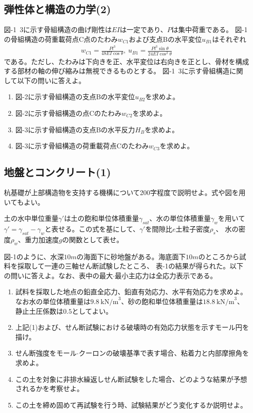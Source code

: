 \subsection{弾性体と構造の力学(2)}
図-1~3に示す骨組構造の曲げ剛性は$EI$は一定であり、$P$は集中荷重である。
図-1の骨組構造の荷重載荷点C点のたわみ$w_{C1}$および支点Bの水平変位$u_{B1}$はそれぞれ
\begin{align*}%
  w_{C1} = \frac{Pl^3}{48EI\cos\theta},\:
  u_{B1} = \frac{Pl^3\sin\theta}{24EI\cos^2\theta}
\end{align*}
である。ただし、たわみは下向きを正、水平変位は右向きを正とし、骨材を構成する部材の軸の伸び縮みは無視できるものとする。
図-1~3に示す骨組構造に関して以下の問いに答えよ。
\begin{enumerate}[1.]
  \item 図-2に示す骨組構造の支点Bの水平変位$u_{B2}$を求めよ。
  \item 図-2に示す骨組構造の点Cのたわみ$w_{C2}$を求めよ。
  \item 図-3に示す骨組構造の支点Bの水平反力$H_B$を求めよ。
  \item 図-3に示す骨組構造の荷重載荷点Cのたわみ$w_{C3}$を求めよ。
\end{enumerate}

\subsection{地盤とコンクリート(1)}

杭基礎が上部構造物を支持する機構について200字程度で説明せよ。式や図を用いてもよい。

土の水中単位重量$\gamma'$は土の飽和単位体積重量$\gamma_{sat}$、水の単位体積重量$\gamma_w$を用いて
$\gamma' = \gamma_{sat} - \gamma_w$と表せる。この式を基にして、$\gamma'$を間隙比$e$土粒子密度$\rho_s$、
水の密度$\rho_w$、重力加速度$g$の関数として表せ。

図-1のように、水深$10m$の海面下に砂地盤がある。海底面下$10m$のところから試料を採取して一連の三軸せん断試験したところ、
表-1の結果が得られた。以下の問いに答えよ。なお、表中の最大$\cdot$最小主応力は全応力表示である。

\begin{enumerate}[(1)]
  \item 試料を採取した地点の鉛直全応力、鉛直有効応力、水平有効応力を求めよ。
        なお水の単位体積重量は$9.8\:\text{kN/m}^3$、砂の飽和単位体積重量は$18.8\:\text{kN/m}^3$、
        静止土圧係数は$0.5$としてよい。
  \item 上記(1)および、せん断試験における破壊時の有効応力状態を示すモール円を描け。
  \item せん断強度をモール$\cdot$クーロンの破壊基準で表す場合、粘着力と内部摩擦角を求めよ。
  \item この土を対象に非排水繰返しせん断試験をした場合、どのような結果が予想されるかを考察せよ。
  \item この土を締め固めて再試験を行う時、試験結果がどう変化するか説明せよ。
\end{enumerate}

